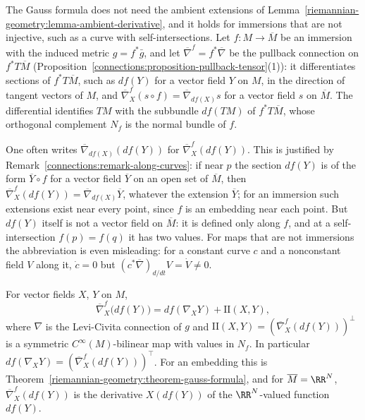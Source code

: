 The Gauss formula does not need the ambient extensions of Lemma~\ref{riemannian-geometry:lemma-ambient-derivative}, and it holds for immersions that are not injective, such
as a curve with self-intersections. Let $f \colon M \to \overline{M}$ be an immersion with the induced metric $g = f^*\bar g$, and let $\overline{\nabla}^f = f^*\overline{\nabla}$ be the
pullback connection on $f^*T\overline{M}$ (Proposition~\ref{connections:proposition-pullback-tensor}(1)): it differentiates sections of $f^*T\overline{M}$, such as $df(Y)$ for a
vector field $Y$ on $M$, in the direction of tangent vectors of $M$, and $\overline{\nabla}^f_X(s \circ f) = \overline{\nabla}_{df(X)}s$ for a vector field $s$ on $\overline{M}$.
The differential identifies $TM$ with the subbundle $df(TM)$ of $f^*T\overline{M}$, whose orthogonal complement $N_f$ is the normal bundle of $f$.

One often writes $\overline{\nabla}_{df(X)}(df(Y))$ for $\overline{\nabla}^f_X(df(Y))$. This is justified by
Remark~\ref{connections:remark-along-curves}: if near $p$ the section $df(Y)$ is of the form $\overline{Y} \circ f$ for a vector field $\overline{Y}$ on an open set of
$\overline{M}$, then $\overline{\nabla}^f_X(df(Y)) = \overline{\nabla}_{df(X)}\overline{Y}$, whatever the extension $\overline{Y}$; for an immersion such extensions exist near
every point, since $f$ is an embedding near each point. But $df(Y)$ itself is not a vector field on $\overline{M}$: it is defined only along $f$, and at a self-intersection
$f(p) = f(q)$ it has two values. For maps that are not immersions the abbreviation is even misleading: for a constant curve $c$ and a nonconstant field $V$ along it,
$\dot c = 0$ but $(c^*\overline{\nabla})_{d/dt}V = \dot V \neq 0$.

\begin{proposition}\label{riemannian-geometry:proposition-gauss-immersion}
For vector fields $X$, $Y$ on $M$,
\[
\overline{\nabla}^f_X\bigl(df(Y)\bigr) = df(\nabla_XY) + \mathrm{II}(X, Y),
\]
where $\nabla$ is the Levi-Civita connection of $g$ and $\mathrm{II}(X, Y) = (\overline{\nabla}^f_X(df(Y)))^\perp$ is a symmetric $C^\infty(M)$-bilinear map with values in $N_f$.
In particular $df(\nabla_XY) = (\overline{\nabla}^f_X(df(Y)))^\top$. For an embedding this is Theorem~\ref{riemannian-geometry:theorem-gauss-formula}, and for
$\overline{M} = \RR^N$, $\overline{\nabla}^f_X(df(Y))$ is the derivative $X(df(Y))$ of the $\RR^N$-valued function $df(Y)$.
\end{proposition}

